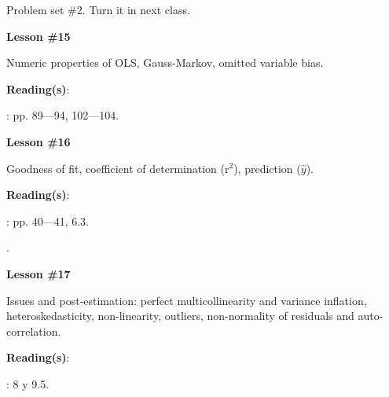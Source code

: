 \documentclass[letterpaper]{article}
\renewenvironment{itemize}{
  \begin{list}{}{
    \setlength{\leftmargin}{1.5em}
  }
}{
  \end{list}
}
\begin{document}
\begin{enumerate}
\item[{\color{red}\Pointinghand}] Problem set \#2. Turn it in next class.


			\begin{itemize} 
				\item[$\bullet$] {\bf Lesson \#15}
					\begin{itemize} 
						\item[$\circ$] Numeric properties of OLS, Gauss-Markov, omitted variable bias. %
						\item[$\circ$] {\bf Reading(s)}: 
							\begin{itemize} 
								\item[$\diamond$] \textcite{Wooldridge2002}: pp. 89---94, 102---104.
							\end{itemize}
					\end{itemize}
			\end{itemize}



			\begin{itemize} 
				\item[$\bullet$] {\bf Lesson \#16}
					\begin{itemize} 
						\item[$\circ$] Goodness of fit, coefficient of determination (r$^2$), prediction ($\hat y$). 
						\item[$\circ$] {\bf Reading(s)}:
							\begin{itemize} 
								\item[$\diamond$] \textcite{Wooldridge2002}: pp. 40---41, 6.3.
								\item[$\diamond$] .

							\end{itemize}
					\end{itemize}
			\end{itemize}



			\begin{itemize} 
				\item[$\bullet$] {\bf Lesson \#17}
					\begin{itemize} 
						\item[$\circ$] Issues and post-estimation: perfect multicollinearity and variance inflation, heteroskedasticity, non-linearity, outliers, non-normality of residuals and auto-correlation. %
						\item[$\circ$] {\bf Reading(s)}: 
						\begin{itemize}
						\item[$\diamond$] \textcite{Wooldridge2002}: 8 y 9.5.
						\end{itemize}
					\end{itemize}
			\end{itemize}




\end{enumerate}
\end{document}
